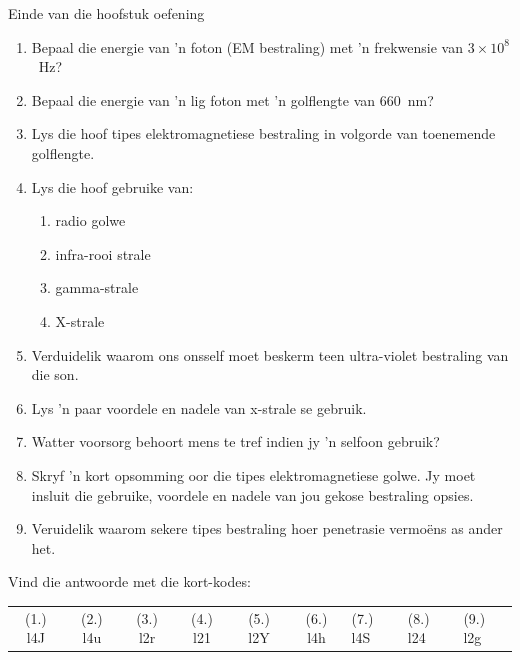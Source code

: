             \begin{eocexercises}{Einde van die hoofstuk oefening}
            \nopagebreak
      \label{m38779*id189872}\begin{enumerate}[noitemsep, label=\textbf{\arabic*}. ] 
            \label{m38779*uid34}\item Bepaal die energie van 'n foton (EM bestraling) met 'n frekwensie van $3\ensuremath{\times}{10}^{8}$~Hz?\newline
\label{m38779*uid35}\item Bepaal die energie van 'n lig foton met 'n golflengte van 660~nm?\newline
\label{m38779*uid36}\item Lys die hoof tipes elektromagnetiese bestraling in volgorde van toenemende golflengte.\newline
\label{m38779*uid37}\item Lys die hoof gebruike van:
\label{m38779*id189946}\begin{enumerate}[noitemsep, label=\textbf{\alph*}. ] 
            \label{m38779*uid38}\item radio golwe
\label{m38779*uid39}\item infra-rooi strale
\label{m38779*uid40}\item gamma-strale
\label{m38779*uid41}\item X-strale
\end{enumerate}
                \label{m38779*uid42}\item Verduidelik waarom ons onsself moet beskerm teen ultra-violet bestraling van die son. \newline
\label{m38779*uid43}\item Lys 'n paar voordele en nadele van x-strale se gebruik. \newline
\label{m38779*uid44}\item Watter voorsorg behoort mens te tref indien jy 'n selfoon gebruik? \newline
\label{m38779*uid45}\item Skryf 'n kort opsomming oor die tipes elektromagnetiese golwe. Jy moet insluit die gebruike, voordele en nadele van jou gekose bestraling opsies.\newline
\label{m38779*uid46}\item Veruidelik waarom sekere tipes bestraling hoer penetrasie vermo\"ens as ander het.\newline
\end{enumerate}
  \label{m38779**end}
  \label{459e2bef85baf867f5850bc8338cad3a**end}
\par {} Vind die antwoorde met die kort-kodes:
 \par \begin{tabular}[h]{cccccc}
 (1.) l4J  &  (2.) l4u  &  (3.) l2r  &  (4.) l21  &  (5.) l2Y  &  (6.) l4h  &  (7.) l4S  &  (8.) l24  &  (9.) l2g  & \end{tabular}
\end{eocexercises}
